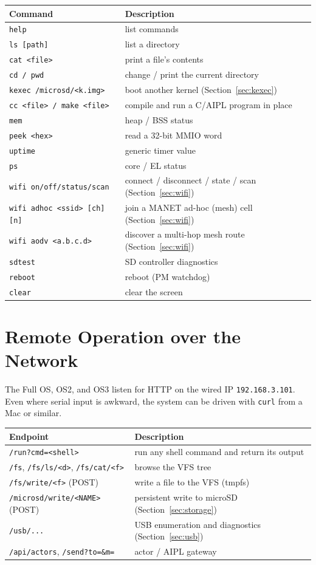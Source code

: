 \documentclass[a4paper,11pt]{article}
\newcommand{\cmd}[1]{\texttt{#1}}
\begin{document}
\begin{longtable}{ll}
\hline
Command & Description \\
\hline
\cmd{help} & list commands \\
\cmd{ls [path]} & list a directory \\
\cmd{cat <file>} & print a file's contents \\
\cmd{cd / pwd} & change / print the current directory \\
\cmd{kexec /microsd/<k.img>} & boot another kernel (Section~\ref{sec:kexec}) \\
\cmd{cc <file> / make <file>} & compile and run a C/AIPL program in place \\
\cmd{mem} & heap / BSS status \\
\cmd{peek <hex>} & read a 32-bit MMIO word \\
\cmd{uptime} & generic timer value \\
\cmd{ps} & core / EL status \\
\cmd{wifi on/off/status/scan} & connect / disconnect / state / scan (Section~\ref{sec:wifi}) \\
\cmd{wifi adhoc <ssid> [ch] [n]} & join a MANET ad-hoc (mesh) cell (Section~\ref{sec:wifi}) \\
\cmd{wifi aodv <a.b.c.d>} & discover a multi-hop mesh route (Section~\ref{sec:wifi}) \\
\cmd{sdtest} & SD controller diagnostics \\
\cmd{reboot} & reboot (PM watchdog) \\
\cmd{clear} & clear the screen \\
\hline
\end{longtable}

\section{Remote Operation over the Network}
\label{sec:remote}
The Full OS, OS2, and OS3 listen for HTTP on the wired IP
\texttt{192.168.3.101}. Even where serial input is awkward, the system can
be driven with \texttt{curl} from a Mac or similar.

\begin{longtable}{ll}
\hline
Endpoint & Description \\
\hline
\cmd{/run?cmd=<shell>} & run any shell command and return its output \\
\cmd{/fs}, \cmd{/fs/ls/<d>}, \cmd{/fs/cat/<f>} & browse the VFS tree \\
\cmd{/fs/write/<f>} (POST) & write a file to the VFS (tmpfs) \\
\cmd{/microsd/write/<NAME>} (POST) & persistent write to microSD (Section~\ref{sec:storage}) \\
\cmd{/usb/...} & USB enumeration and diagnostics (Section~\ref{sec:usb}) \\
\cmd{/api/actors}, \cmd{/send?to=\&m=} & actor / AIPL gateway \\
\hline
\end{longtable}
\end{document}
